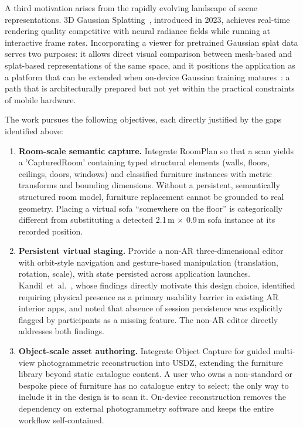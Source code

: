 A third motivation arises from the rapidly evolving landscape of scene
representations. 3D Gaussian Splatting~\cite{kerbl20233dgs}, introduced in
2023, achieves real-time rendering quality competitive with neural radiance
fields while running at interactive frame rates. Incorporating a viewer for
pretrained Gaussian splat data serves two purposes: it allows direct visual
comparison between mesh-based and splat-based representations of the same
space, and it positions the application as a platform that can be extended
when on-device Gaussian training matures~\cite{Guo26}: a path that is
architecturally prepared but not yet within the practical constraints of
mobile hardware.

The work pursues the following objectives, each directly justified by the
gaps identified above:

\begin{enumerate}
  \item \textbf{Room-scale semantic capture.}
    Integrate RoomPlan so that a scan yields a 'CapturedRoom' containing
    typed structural elements (walls, floors, ceilings, doors, windows) and
    classified furniture instances with metric transforms and bounding dimensions. Without a persistent, semantically structured room
    model, furniture replacement cannot be grounded to real geometry. Placing a
    virtual sofa ``somewhere on the floor'' is categorically different from
    substituting a detected 2.1\,m $\times$ 0.9\,m sofa instance at its
    recorded position.

  \item \textbf{Persistent virtual staging.}
    Provide a non-AR three-dimensional editor with orbit-style navigation and
    gesture-based manipulation (translation, rotation, scale), with state
    persisted across application launches. Kandil~et~al.~\cite{kandil2021ux},
    whose findings directly motivate this design choice, identified requiring
    physical presence as a primary usability barrier in existing AR interior
    apps, and noted that absence of session persistence was explicitly flagged
    by participants as a missing feature. The non-AR editor directly addresses
    both findings.

  \item \textbf{Object-scale asset authoring.}
    Integrate Object Capture for guided multi-view photogrammetric
    reconstruction into USDZ, extending the furniture library beyond static
    catalogue content.
    A user who owns a non-standard or bespoke piece of
    furniture has no catalogue entry to select; the only way to include it in
    the design is to scan it. On-device reconstruction removes the dependency
    on external photogrammetry software and keeps the entire workflow
    self-contained.


\end{enumerate}
